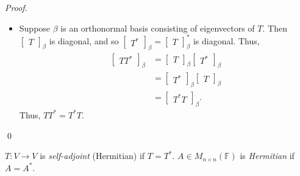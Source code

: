 \documentclass[12pt]{article}
\newenvironment{definition}[2][Definition]{\begin{trivlist}
\item[\hskip \labelsep {\bfseries #1}\hskip \labelsep {\bfseries #2}]}{\end{trivlist}}
\newenvironment{sol}
    {\emph{Proof.}
    }
    {
    \qed
    }
\begin{document}
\begin{sol}
\begin{itemize}
    \item[$\Longleftarrow$] Suppose $\beta$ is an orthonormal basis consisting of eigenvectors of $T$. Then $\begin{bmatrix}
    T
    \end{bmatrix}_\beta$ is diagonal, and so $\begin{bmatrix}
    T^*
    \end{bmatrix}_\beta = \begin{bmatrix}
    T
    \end{bmatrix}_\beta^*$ is diagonal. Thus, \begin{align*}
        \begin{bmatrix}
        TT^*
        \end{bmatrix}_\beta &= \begin{bmatrix}
        T
        \end{bmatrix}_\beta \begin{bmatrix}
        T^*
        \end{bmatrix}_\beta \\
        &= \begin{bmatrix}
        T^*
        \end{bmatrix}_\beta \begin{bmatrix}
        T
        \end{bmatrix}_\beta \\
        &= \begin{bmatrix}
        T^*T
        \end{bmatrix}_\beta.
    \end{align*}
    Thus, $TT^* = T^*T$.
\end{itemize}
\end{sol}

\begin{definition}{8}
$T : V \to V$ is \textit{self-adjoint} (Hermitian) if $T = T^*$. $A \in M_{n \times n}(\mathbb{F})$ is \textit{Hermitian} if $A = A^*$. 
\end{definition}
\end{document}
